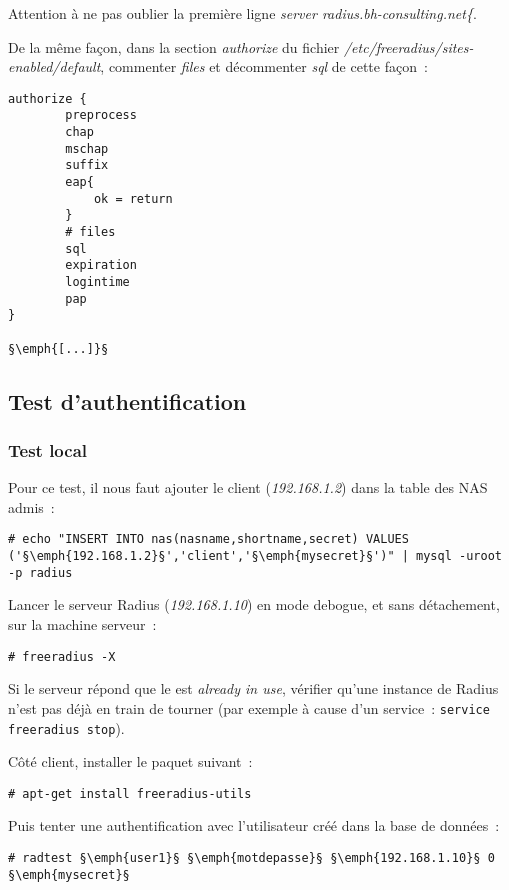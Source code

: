 Attention à ne pas oublier la première ligne \emph{server radius.bh-consulting.net\{}.

De la même façon, dans la section \emph{authorize} du fichier \emph{/etc/freeradius/sites-enabled/default}, commenter \emph{files} et décommenter \emph{sql} de cette façon~:

\begin{lstlisting}
authorize {
        preprocess
        chap
        mschap
        suffix
        eap{
            ok = return
        }
        # files
        sql
        expiration
        logintime
        pap
}

§\emph{[...]}§
\end{lstlisting}

\subsection{Test d'authentification}
\subsubsection{Test local}

Pour ce test, il nous faut ajouter le client (\emph{192.168.1.2}) dans la table des NAS admis~:

\begin{lstlisting}
# echo "INSERT INTO nas(nasname,shortname,secret) VALUES ('§\emph{192.168.1.2}§','client','§\emph{mysecret}§')" | mysql -uroot -p radius
\end{lstlisting}

Lancer le serveur Radius (\emph{192.168.1.10}) en mode debogue, et sans détachement, sur la machine serveur~:

\begin{lstlisting}
# freeradius -X
\end{lstlisting}

Si le serveur répond que le est \emph{already in use}, vérifier qu'une instance de Radius n'est pas déjà en train de tourner (par exemple à cause d'un service~: \texttt{service freeradius stop}).

Côté client, installer le paquet suivant~:

\begin{lstlisting}
# apt-get install freeradius-utils
\end{lstlisting}

Puis tenter une authentification avec l'utilisateur créé dans la base de données~:

\begin{lstlisting}
# radtest §\emph{user1}§ §\emph{motdepasse}§ §\emph{192.168.1.10}§ 0 §\emph{mysecret}§
\end{lstlisting}

